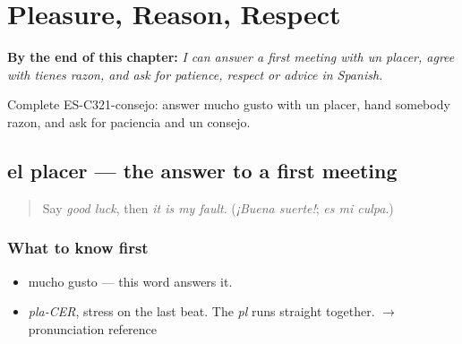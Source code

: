 
\chapter{Pleasure, Reason, Respect}
\label{ch:placer-y-consejo}

\begin{chapteropening}
\textbf{By the end of this chapter:} \emph{I can answer a first meeting with un placer, agree with tienes razon, and ask for patience, respect or advice in Spanish.}

Complete ES-C321-consejo: answer mucho gusto with un placer, hand somebody razon, and ask for paciencia and un consejo.
\end{chapteropening}

\section[el placer]{el placer — the answer to a first meeting}

\label{lesson:ES-C321-placer}



\begin{quote}
Say \emph{good luck}, then \emph{it is my fault}. (\emph{¡Buena suerte!}; \emph{es mi culpa}.)
\end{quote}

\subsection*{What to know first}
\begin{itemize}
\raggedright
  \item mucho gusto — this word answers it.
\end{itemize}

\begin{sounds}
\begin{itemize}
\raggedright
  \item \emph{pla-CER}, stress on the last beat. The \emph{pl} runs straight together. $\to$ pronunciation reference
\end{itemize}
\end{sounds}


